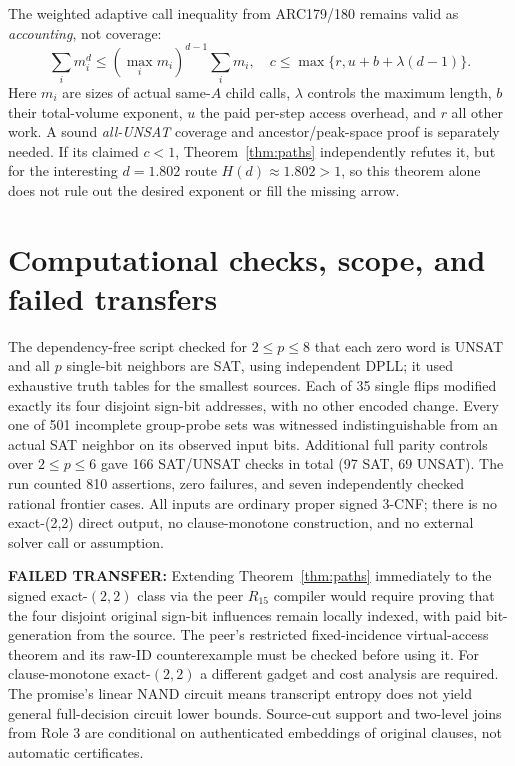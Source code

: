 \documentclass[11pt]{article}
\begin{document}
The weighted adaptive call inequality from ARC179/180 remains valid as \emph{accounting}, not coverage:
\[
 \sum_i m_i^d\le(\max_i m_i)^{d-1}\sum_i m_i,
 \quad c\le\max\{r,u+b+\lambda(d-1)\}.
\]
Here $m_i$ are sizes of actual same-$A$ child calls, $\lambda$ controls the maximum length, $b$ their total-volume exponent, $u$ the paid per-step access overhead, and $r$ all other work. A sound \emph{all-UNSAT} coverage and ancestor/peak-space proof is separately needed. If its claimed $c<1$, Theorem~\ref{thm:paths} independently refutes it, but for the interesting $d=1.802$ route $H(d)\approx1.802>1$, so this theorem alone does not rule out the desired exponent or fill the missing arrow.

\section{Computational checks, scope, and failed transfers}
The dependency-free script  checked for $2\le p\le8$ that each zero word is UNSAT and all $p$ single-bit neighbors are SAT, using independent DPLL; it used exhaustive truth tables for the smallest sources. Each of 35 single flips modified exactly its four disjoint sign-bit addresses, with no other encoded change. Every one of 501 incomplete group-probe sets was witnessed indistinguishable from an actual SAT neighbor on its observed input bits. Additional full parity controls over $2\le p\le6$ gave 166 SAT/UNSAT checks in total (97 SAT, 69 UNSAT). The run counted 810 assertions, zero failures, and seven independently checked rational frontier cases. All inputs are ordinary proper signed 3-CNF; there is no exact-(2,2) direct output, no clause-monotone construction, and no external solver call or assumption.

\textbf{FAILED TRANSFER:} Extending Theorem~\ref{thm:paths} immediately to the signed exact-$(2,2)$ class via the peer $R_{15}$ compiler would require proving that the four disjoint original sign-bit influences remain locally indexed, with paid bit-generation from the source. The peer's restricted fixed-incidence virtual-access theorem and its raw-ID counterexample must be checked before using it. For clause-monotone exact-$(2,2)$ a different gadget and cost analysis are required. The promise's linear NAND circuit means transcript entropy does not yield general full-decision circuit lower bounds. Source-cut support and two-level joins from Role 3 are conditional on authenticated embeddings of original clauses, not automatic certificates.
\end{document}
